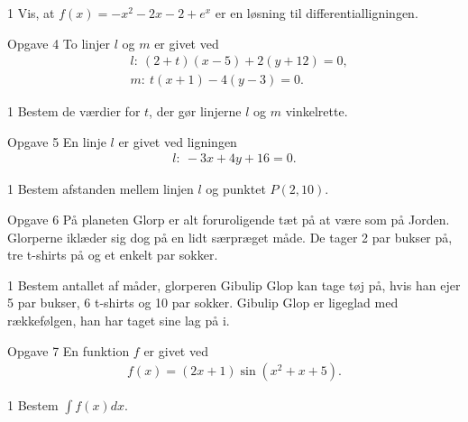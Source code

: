 \begin{delopgave}{1}
	Vis, at $f(x) = -x^2 - 2x - 2 + e^x$ er en løsning til differentialligningen. 
\end{delopgave}
%
%
%
%
%
\newpage
\begin{opgavetekst}{Opgave 4}
	To linjer $l$ og $m$ er givet ved
	\begin{align*}
		&l: \ (2 + t)(x - 5) + 2(y + 12) = 0,\\
		&m: \ t(x + 1) - 4(y - 3) = 0.
	\end{align*}
\end{opgavetekst}
\begin{delopgave}{1}
	Bestem de værdier for $t$, der gør linjerne $l$ og $m$ vinkelrette. 
\end{delopgave}
%
%
%
%
%
\begin{opgavetekst}{Opgave 5}
	En linje $l$ er givet ved ligningen
	\begin{align*}
		l: \ -3x + 4y + 16 = 0. 
	\end{align*}
\end{opgavetekst}
\begin{delopgave}{1}
	Bestem afstanden mellem linjen $l$ og punktet $P(2,10)$.
\end{delopgave}
%
%
%
%
%
\begin{opgavetekst}{Opgave 6}
	På planeten Glorp er alt foruroligende tæt på at være som på Jorden. Glorperne iklæder sig dog på en lidt særpræget måde.
	De tager 2 par bukser på, tre t-shirts på og et enkelt par sokker. 
\end{opgavetekst}
\begin{delopgave}{1}
	Bestem antallet af måder, glorperen Gibulip Glop kan tage tøj på, hvis han ejer 5 par bukser, 6 t-shirts og 10 par sokker. Gibulip Glop er ligeglad med rækkefølgen, han har taget sine lag på i. 
\end{delopgave}
%
%
%
%
%

\begin{opgavetekst}{Opgave 7}
	En funktion $f$ er givet ved
	\begin{align*}
		f(x) = (2x + 1)\sin(x^2 + x + 5).
	\end{align*}
\end{opgavetekst}
\begin{delopgave}{1}
	Bestem $\int f(x) dx$.
\end{delopgave}
\newpage
%
%
%
%

